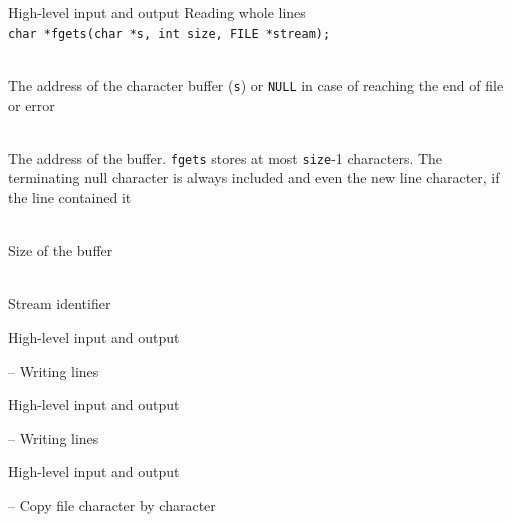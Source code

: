 \documentclass[usenames,dvipsnames,aspectratio=169]{beamer}
\begin{document}
\begin{frame}{High-level input and output}
  Reading whole lines\\
  \footnotesize
  \texttt{char *fgets(char *s, int size, FILE *stream);} \\
  \begin{description}[mm]
    \item[Return value] \hfill \\
      The address of the character buffer (\texttt{s}) or \texttt{NULL} in case of reaching the end of file or error
    \item[\texttt{s}] \hfill \\
      The address of the buffer. \texttt{fgets} stores at most \texttt{size}-1 characters. The terminating null character is always included and even the new line character, if the line contained it
    \item[\texttt{size}] \hfill \\
      Size of the buffer
    \item[\texttt{stream}] \hfill \\
      Stream identifier
  \end{description}
\end{frame}

\begin{frame}[fragile]{High-level input and output}
  \small
  \begin{exampleblock}{ -- Writing lines}
    
  \end{exampleblock}
\end{frame}

\begin{frame}[fragile]{High-level input and output}
  \small
  \begin{exampleblock}{ -- Writing lines}
    
  \end{exampleblock}
\end{frame}

\begin{frame}[fragile]{High-level input and output}
  \small
  \begin{exampleblock}{ -- Copy file character by character}
    \vspace{-.2cm}
    
    \vspace{-.2cm}
  \end{exampleblock}
\end{frame}
\end{document}
